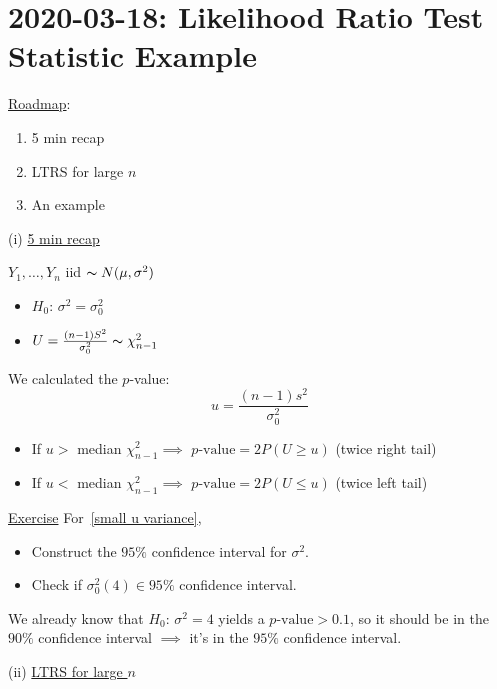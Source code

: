 \section{2020-03-18: Likelihood Ratio Test Statistic Example}
\underline{Roadmap}:
\begin{enumerate}[label=(\roman*)]
    \item 5 min recap
    \item LTRS for large $ n $
    \item An example
\end{enumerate}

(i) \underline{5 min recap}

$ Y_1,\ldots ,Y_n $ iid $ \thicksim N(\mu,\sigma^2) $
\begin{itemize}
    \item $ H_0 $: $ \sigma^2=\sigma_0^2 $
    \item $ U=\frac{(n-1)S^2}{\sigma_0^2} \thicksim \chi^2_{n-1} $
\end{itemize}
We calculated the $ p $-value:
\[ u=\frac{(n-1)s^2}{\sigma_0^2}  \]
\begin{itemize}
    \item If $ u > $ median $ \chi^2_{n-1} \implies $ $ p\text{-value}=2P(U\geqslant u) $ (twice right tail)
    \item If $ u < $ median $ \chi^2_{n-1} \implies $ $ p\text{-value}=2P(U\leqslant u) $ (twice left tail)
\end{itemize}
\underline{Exercise} For~\ref{small u variance},
\begin{itemize}
    \item Construct the $ 95\% $ confidence interval for $ \sigma^2 $.
    \item Check if $ \sigma_0^2(4)\in 95\% $ confidence interval.
\end{itemize}
We already know that $ H_0 $: $ \sigma^2=4 $ yields a $ p\text{-value}>0.1 $, so it should
be in the $ 90\% $ confidence interval $ \implies $ it's in the $ 95\% $ confidence interval.

(ii) \underline{LTRS for large $ n $}


